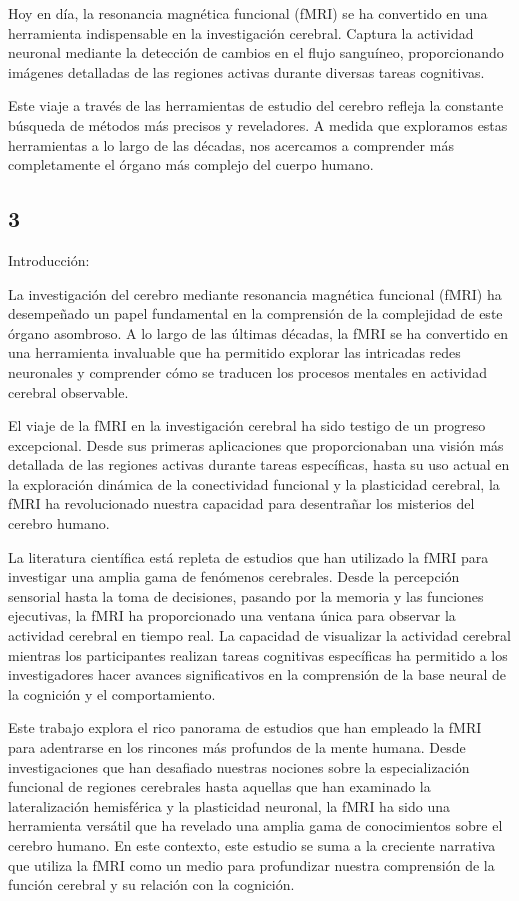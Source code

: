 \documentclass{article}
\begin{document}
	Hoy en día, la resonancia magnética funcional (fMRI) se ha convertido en una herramienta indispensable en la investigación cerebral. Captura la actividad neuronal mediante la detección de cambios en el flujo sanguíneo, proporcionando imágenes detalladas de las regiones activas durante diversas tareas cognitivas.
	
	Este viaje a través de las herramientas de estudio del cerebro refleja la constante búsqueda de métodos más precisos y reveladores. A medida que exploramos estas herramientas a lo largo de las décadas, nos acercamos a comprender más completamente el órgano más complejo del cuerpo humano.
	
	\subsection{3}
	Introducción:
	
	La investigación del cerebro mediante resonancia magnética funcional (fMRI) ha desempeñado un papel fundamental en la comprensión de la complejidad de este órgano asombroso. A lo largo de las últimas décadas, la fMRI se ha convertido en una herramienta invaluable que ha permitido explorar las intricadas redes neuronales y comprender cómo se traducen los procesos mentales en actividad cerebral observable.
	
	El viaje de la fMRI en la investigación cerebral ha sido testigo de un progreso excepcional. Desde sus primeras aplicaciones que proporcionaban una visión más detallada de las regiones activas durante tareas específicas, hasta su uso actual en la exploración dinámica de la conectividad funcional y la plasticidad cerebral, la fMRI ha revolucionado nuestra capacidad para desentrañar los misterios del cerebro humano.
	
	La literatura científica está repleta de estudios que han utilizado la fMRI para investigar una amplia gama de fenómenos cerebrales. Desde la percepción sensorial hasta la toma de decisiones, pasando por la memoria y las funciones ejecutivas, la fMRI ha proporcionado una ventana única para observar la actividad cerebral en tiempo real. La capacidad de visualizar la actividad cerebral mientras los participantes realizan tareas cognitivas específicas ha permitido a los investigadores hacer avances significativos en la comprensión de la base neural de la cognición y el comportamiento.
	
	Este trabajo explora el rico panorama de estudios que han empleado la fMRI para adentrarse en los rincones más profundos de la mente humana. Desde investigaciones que han desafiado nuestras nociones sobre la especialización funcional de regiones cerebrales hasta aquellas que han examinado la lateralización hemisférica y la plasticidad neuronal, la fMRI ha sido una herramienta versátil que ha revelado una amplia gama de conocimientos sobre el cerebro humano. En este contexto, este estudio se suma a la creciente narrativa que utiliza la fMRI como un medio para profundizar nuestra comprensión de la función cerebral y su relación con la cognición.
	
\end{document}
